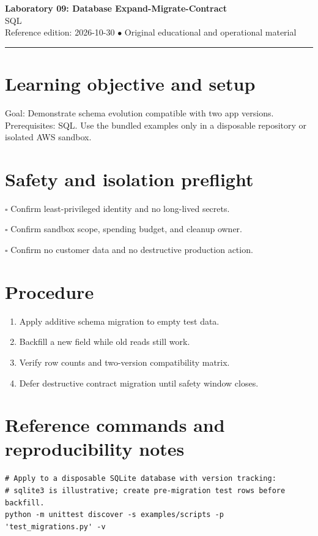 \documentclass[10pt,letterpaper]{article}
\begin{document}
\begin{center}
{\LARGE\bfseries\color{cdblue}Laboratory 09: Database Expand-Migrate-Contract}\\[7pt]
{\large SQL}\\[6pt]
{\small Reference edition: 2026-10-30 $\bullet$ Original educational and operational material}
\end{center}
\noindent\color{cdblue}\rule{\linewidth}{1.2pt}\color{black}
\vspace{0.4em}
\section{Learning objective and setup}
Goal: Demonstrate schema evolution compatible with two app versions. Prerequisites: SQL. Use the bundled examples only in a disposable repository or isolated AWS sandbox.


\section{Safety and isolation preflight}
\noindent $\square$ Confirm least-privileged identity and no long-lived secrets.\par\vspace{0.35em}
\noindent $\square$ Confirm sandbox scope, spending budget, and cleanup owner.\par\vspace{0.35em}
\noindent $\square$ Confirm no customer data and no destructive production action.\par\vspace{0.35em}

\section{Procedure}
\begin{enumerate}
\item Apply additive schema migration to empty test data.
\item Backfill a new field while old reads still work.
\item Verify row counts and two-version compatibility matrix.
\item Defer destructive contract migration until safety window closes.
\end{enumerate}

\section{Reference commands and reproducibility notes}
\begin{verbatim}
# Apply to a disposable SQLite database with version tracking:
# sqlite3 is illustrative; create pre-migration test rows before backfill.
python -m unittest discover -s examples/scripts -p 'test_migrations.py' -v
\end{verbatim}
\end{document}
